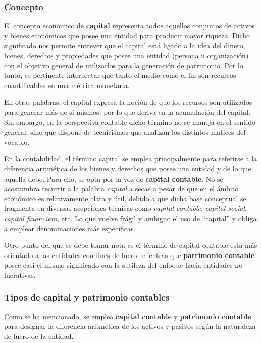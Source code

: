 \documentclass[12pt]{article}
\begin{document}
		\subsubsection{Concepto}

		El concepto económico de \textbf{capital} representa todos aquellos conjuntos de activos y bienes económicos que posee una entidad para producir mayor riqueza. Dicho significado nos permite entrever que el capital está ligado a la idea del dinero, bienes, derechos y propiedades que posee una entidad (persona u organización) con el objetivo general de utilizarlos para la generación de patrimonio. Por lo tanto, es pertinente interpretar que tanto el medio como el fin son recursos cuantificables en una métrica monetaria. 

		En otras palabras, el capital expresa la noción de que los recursos son utilizados para generar más de sí mismos, por lo que deriva en la acumulación del capital. Sin embargo, en la perspectiva contable dicho término no se maneja en el sentido general, sino que dispone de tecnicismos que analizan los distintos matices del vocablo.

		En la contabilidad, el término capital se emplea principalmente para referirse a la diferencia aritmética de los bienes y derechos que posee una entidad y de lo que aquella debe. Para ello, se opta por la voz de \textbf{capital contable}. No se acostumbra recurrir a la palabra \emph{capital} a secas a pesar de que en el ámbito económico es relativamente clara y útil, debido a que dicha base conceptual se fragmenta en diversas acepciones técnicas como \emph{capital contable}, \emph{capital social}, \emph{capital financiero}, etc. Lo que vuelve frágil y ambiguo el uso de ``capital'' y obliga a emplear denominaciones más específicas.

		 Otro punto del que se debe tomar nota es el término de capital contable está más orientado a las entidades con fines de lucro, mientras que \textbf{patrimonio contable} posee casi el mismo significado con la sutileza del enfoque hacia entidades no lucrativas.

		\subsubsection{Tipos de capital y patrimonio contables}

		Como se ha mencionado, se emplea \textbf{capital contable} y \textbf{patrimonio contable} para designar la diferencia aritmética de los activos y pasivos según la naturaleza de lucro de la entidad.
\end{document}
